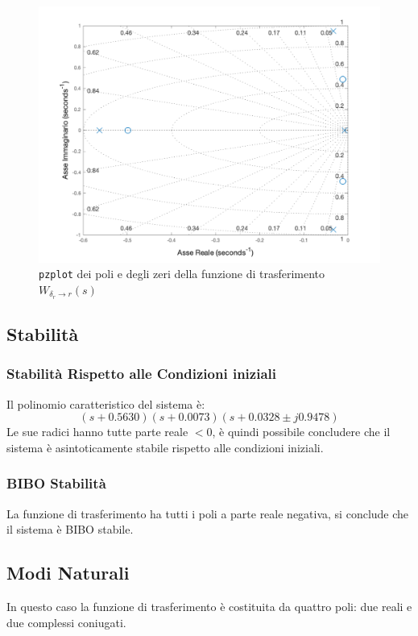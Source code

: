 \begin{figure}[H]
    \centering
    \includegraphics[width=0.7\linewidth]{Immagini/poli_laterali.pdf}
    \caption{\texttt{pzplot} dei poli e degli zeri della funzione di trasferimento $ W_{\delta_r \rightarrow r}(s)$}
\end{figure}

\subsection{Stabilità}

\subsubsection{Stabilità Rispetto alle Condizioni iniziali}

Il polinomio caratteristico del sistema è:
\begin{equation*}
    (s + 0.5630)(s + 0.0073)(s + 0.0328 \pm j0.9478)
\end{equation*}
Le sue radici hanno tutte parte reale $< 0$, è quindi possibile concludere che il sistema è asintoticamente stabile rispetto alle condizioni iniziali.

\subsubsection{BIBO Stabilità}

La funzione di trasferimento ha tutti i poli a parte reale negativa, si conclude che il sistema è BIBO stabile.

\subsection{Modi Naturali}

In questo caso la funzione di trasferimento è costituita da quattro poli: due reali e due complessi coniugati.

